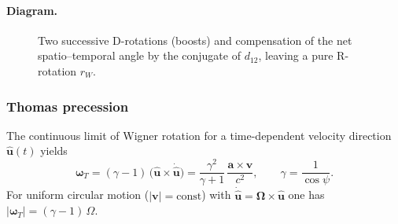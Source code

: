 \documentclass[11pt]{article}
\numberwithin{equation}{section}
\begin{document}
\paragraph{Diagram.}
\begin{figure}[!ht]
\centering
{}
\caption{Two successive D-rotations (boosts) and compensation of the net spatio--temporal angle by the conjugate of $d_{12}$, leaving a pure R-rotation $r_W$.}
\label{fig:tikz-wigner-pullback}
\end{figure}

\subsubsection{Thomas precession}
\label{subsec:thomas}
The continuous limit of Wigner rotation for a time-dependent velocity direction $\hat{\mathbf u}(t)$ yields
\begin{equation}
\boldsymbol{\omega}_T=(\gamma-1)\,\bigl(\hat{\mathbf u}\times \dot{\hat{\mathbf u}}\bigr)
=\frac{\gamma^2}{\gamma+1}\,\frac{\mathbf a\times \mathbf v}{c^2},\qquad
\gamma=\frac{1}{\cos\psi}.
\end{equation}
For uniform circular motion ($|\mathbf v|=\mathrm{const}$) with $\dot{\hat{\mathbf u}}=\boldsymbol{\Omega}\times\hat{\mathbf u}$ one has
$\lvert\boldsymbol{\omega}_T\rvert=(\gamma-1)\,\Omega$.
\end{document}
